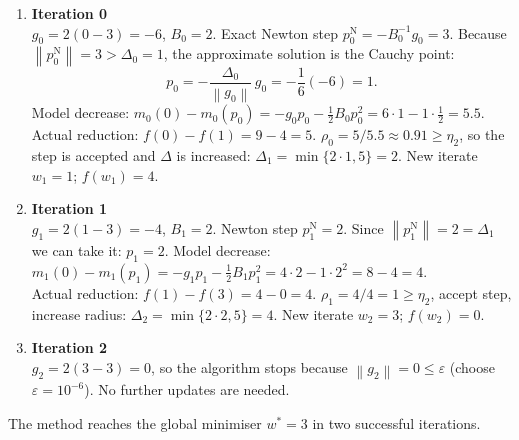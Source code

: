 \documentclass{article}
\newcommand{\norm}[1]{\left\lVert#1\right\rVert}
\begin{document}
\begin{enumerate}[label=Iteration \arabic*:, leftmargin=*]
\item \textbf{Iteration 0}\\
$g_{0}=2(0-3)=-6$, $B_{0}=2$.  
Exact Newton step $p^{\text{N}}_{0}= -B_{0}^{-1}g_{0}=3$.  
Because $\norm{p^{\text{N}}_{0}}=3>\Delta_{0}=1$, the approximate solution is the Cauchy point:
\[
p_{0}= -\frac{\Delta_{0}}{\norm{g_{0}}}\,g_{0}
      = -\frac{1}{6}(-6)=1.
\]
Model decrease: $m_{0}(0)-m_{0}(p_{0})= -g_{0}p_{0}-\tfrac12 B_{0}p_{0}^{2}=6\cdot1-1\cdot\frac12=5.5$.\\
Actual reduction: $f(0)-f(1) = 9-4 =5$.  
$\rho_{0}=5/5.5\approx0.91\ge\eta_{2}$, so the step is accepted and $\Delta$ is increased:
$\Delta_{1}= \min\{2\cdot1,5\}=2$.  
New iterate $w_{1}=1$; $f(w_{1})=4$.

\item \textbf{Iteration 1}\\
$g_{1}=2(1-3)=-4$, $B_{1}=2$.  
Newton step $p^{\text{N}}_{1}=2$. Since $\norm{p^{\text{N}}_{1}}=2=\Delta_{1}$ we can take it:
$p_{1}=2$.  
Model decrease: $m_{1}(0)-m_{1}(p_{1})= -g_{1}p_{1}-\tfrac12 B_{1}p_{1}^{2}=4\cdot2-1\cdot2^{2}=8-4=4$.\\
Actual reduction: $f(1)-f(3)=4-0=4$.  
$\rho_{1}=4/4=1\ge\eta_{2}$, accept step, increase radius:
$\Delta_{2}= \min\{2\cdot2,5\}=4$.  
New iterate $w_{2}=3$; $f(w_{2})=0$.

\item \textbf{Iteration 2}\\
$g_{2}=2(3-3)=0$, so the algorithm stops because $\norm{g_{2}}=0\le\varepsilon$ (choose $\varepsilon=10^{-6}$).  
No further updates are needed.
\end{enumerate}
The method reaches the global minimiser $w^{*}=3$ in two successful iterations.

\newpage
\end{document}
